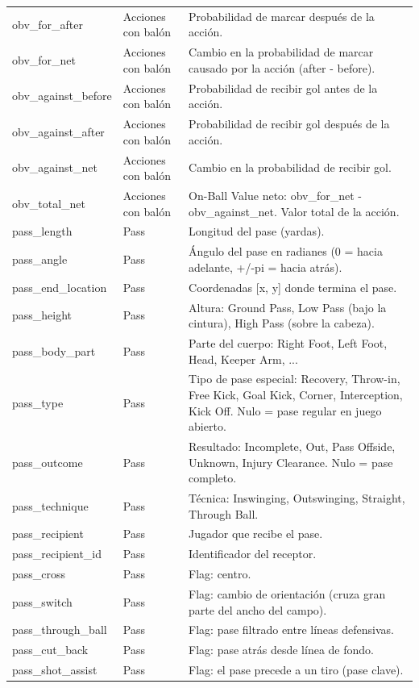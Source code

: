 {\begin{longtable}{p{4.3cm}p{2.2cm}p{8.8cm}}
obv\_for\_after & Acciones con balón & Probabilidad de marcar después de la acción. \\
obv\_for\_net & Acciones con balón & Cambio en la probabilidad de marcar causado por la acción (after - before). \\
obv\_against\_before & Acciones con balón & Probabilidad de recibir gol antes de la acción. \\
obv\_against\_after & Acciones con balón & Probabilidad de recibir gol después de la acción. \\
obv\_against\_net & Acciones con balón & Cambio en la probabilidad de recibir gol. \\
obv\_total\_net & Acciones con balón & On-Ball Value neto: obv\_for\_net - obv\_against\_net. Valor total de la acción. \\
pass\_length & Pass & Longitud del pase (yardas). \\
pass\_angle & Pass & Ángulo del pase en radianes (0 = hacia adelante, +/-pi = hacia atrás). \\
pass\_end\_location & Pass & Coordenadas [x, y] donde termina el pase. \\
pass\_height & Pass & Altura: Ground Pass, Low Pass (bajo la cintura), High Pass (sobre la cabeza). \\
pass\_body\_part & Pass & Parte del cuerpo: Right Foot, Left Foot, Head, Keeper Arm, ... \\
pass\_type & Pass & Tipo de pase especial: Recovery, Throw-in, Free Kick, Goal Kick, Corner, Interception, Kick Off. Nulo = pase regular en juego abierto. \\
pass\_outcome & Pass & Resultado: Incomplete, Out, Pass Offside, Unknown, Injury Clearance. Nulo = pase completo. \\
pass\_technique & Pass & Técnica: Inswinging, Outswinging, Straight, Through Ball. \\
pass\_recipient & Pass & Jugador que recibe el pase. \\
pass\_recipient\_id & Pass & Identificador del receptor. \\
pass\_cross & Pass & Flag: centro. \\
pass\_switch & Pass & Flag: cambio de orientación (cruza gran parte del ancho del campo). \\
pass\_through\_ball & Pass & Flag: pase filtrado entre líneas defensivas. \\
pass\_cut\_back & Pass & Flag: pase atrás desde línea de fondo. \\
pass\_shot\_assist & Pass & Flag: el pase precede a un tiro (pase clave). \\

\end{longtable}}
